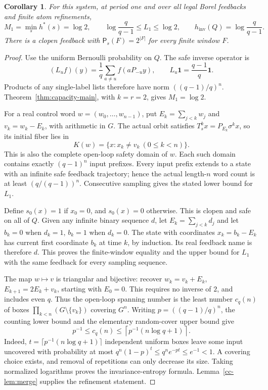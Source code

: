 \documentclass[11pt,reqno]{amsart}
\numberwithin{equation}{section}
\newtheorem{corollary}[theorem]{Corollary}
\theoremstyle{definition}
\theoremstyle{definition}
\newcommand{\Patt}{\mathsf P}
\newcommand{\hinv}{h_{\mathrm{inv}}}
\newcommand{\one}{\mathbf 1}
\begin{document}
\begin{corollary}\label{cor:cyclic}
For this system, at period one and over all legal Borel feedbacks
and finite atom refinements,
\[
 M_1=\min_s h^*(s)=\log2,\qquad
 \log\frac q{q-1}\le L_1\le\log2,\qquad
 \hinv(Q)=\log\frac q{q-1}.
\]
There is a clopen feedback with $\Patt_s(F)=2^{|F|}$ for every
finite window $F$.
\end{corollary}
\begin{proof}
Use the uniform Bernoulli probability on $Q$. The safe inverse
operator is
\[
 (L_uf)(y)=\frac1q\sum_{a\ne u}f(aP_{-u}y),
 \qquad L_u\one=\frac{q-1}{q}\one.
\]
Products of any single-label lists therefore have norm
$((q-1)/q)^n$. Theorem~\ref{thm:capacity-main}, with $k=r=2$,
gives $M_1=\log2$.

For a real control word $w=(w_0,\ldots,w_{n-1})$, put
$E_k=\sum_{j<k}w_j$ and $v_k=w_k-E_k$, with arithmetic in $G$.
The actual orbit satisfies $T_s^kx=P_{E_k}\sigma^kx$, so its
initial fiber lies in
\[
 K(w)=\{x:x_k\ne v_k\ (0\le k<n)\}.
\]
This is also the complete open-loop safety domain of $w$.
Each such domain contains exactly $(q-1)^n$ input prefixes.
Every input prefix extends to a state with an infinite safe
feedback trajectory; hence the actual length-$n$ word count is
at least $(q/(q-1))^n$. Consecutive sampling gives the stated
lower bound for $L_1$.

Define $s_0(x)=1$ if $x_0=0$, and $s_0(x)=0$ otherwise.
This is clopen and safe on all of $Q$. Given any infinite binary
sequence $d$, let $E_k=\sum_{j<k}d_j$ and let $b_k=0$ when
$d_k=1$, $b_k=1$ when $d_k=0$. The state with coordinates
$x_k=b_k-E_k$ has current first coordinate $b_k$ at time $k$,
by induction. Its real feedback name is therefore $d$.
This proves the finite-window equality and the upper bound for
$L_1$ with the same feedback for every sampling sequence.

The map $w\mapsto v$ is triangular and bijective: recover
$w_k=v_k+E_k$, $E_{k+1}=2E_k+v_k$, starting with $E_0=0$.
This requires no inverse of $2$, and includes even $q$.
Thus the open-loop spanning number is the least number $c_q(n)$
of boxes $\prod_{k<n}(G\setminus\{v_k\})$ covering $G^n$.
Writing $p=((q-1)/q)^n$, the counting lower bound and the
elementary random-cover upper bound give
\[
 p^{-1}\le c_q(n)\le
 \left\lceil p^{-1}(n\log q+1)\right\rceil.
\]
Indeed, $t=\lceil p^{-1}(n\log q+1)\rceil$ independent uniform
boxes leave some input uncovered with probability at most
$q^n(1-p)^t\le q^ne^{-pt}\le e^{-1}<1$.
A covering choice exists, and removal of repetitions can only
decrease its size. Taking normalized logarithms proves the
invariance-entropy formula. Lemma~\ref{cc-lem:merge} supplies
the refinement statement.
\end{proof}
\end{document}
